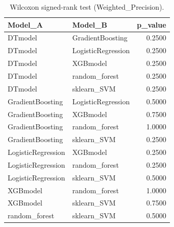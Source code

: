 \begin{table}[t]
\centering
\begin{tabular}{llr}
\toprule
Model_A & Model_B & p_value \\
\midrule
DTmodel & GradientBoosting & 0.2500 \\
DTmodel & LogisticRegression & 0.2500 \\
DTmodel & XGBmodel & 0.2500 \\
DTmodel & random_forest & 0.2500 \\
DTmodel & sklearn_SVM & 0.2500 \\
GradientBoosting & LogisticRegression & 0.5000 \\
GradientBoosting & XGBmodel & 0.7500 \\
GradientBoosting & random_forest & 1.0000 \\
GradientBoosting & sklearn_SVM & 0.2500 \\
LogisticRegression & XGBmodel & 0.2500 \\
LogisticRegression & random_forest & 0.2500 \\
LogisticRegression & sklearn_SVM & 0.5000 \\
XGBmodel & random_forest & 1.0000 \\
XGBmodel & sklearn_SVM & 0.7500 \\
random_forest & sklearn_SVM & 0.5000 \\
\bottomrule
\end{tabular}
\caption{Wilcoxon signed-rank test (Weighted_Precision).}
\label{tab:wilcoxon_Weighted_Precision}
\end{table}